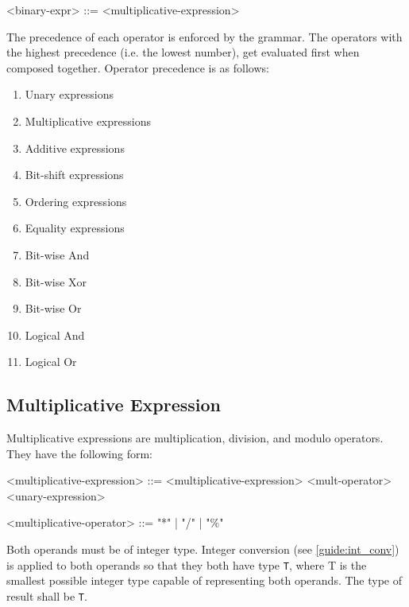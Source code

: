 \begin{minip}
\begin{grammar}
<binary-expr> ::= <multiplicative-expression>
\end{grammar}
\end{minip}

The precedence of each operator is enforced by the grammar. The operators with the highest precedence (i.e. the lowest number), get evaluated first when composed together. Operator precedence is as follows:

\begin{enumerate}
\singlespacing
\item Unary expressions
\item Multiplicative expressions
\item Additive expressions
\item Bit-shift expressions
\item Ordering expressions
\item Equality expressions
\item Bit-wise And
\item Bit-wise Xor
\item Bit-wise Or
\item Logical And
\item Logical Or
\end{enumerate}

\subsection{Multiplicative Expression} \label{guide:mult_expr}

Multiplicative expressions are multiplication, division, and modulo operators. They have the following form:

\begin{minip}
\begin{grammar}
<multiplicative-expression> ::= <multiplicative-expression> 
<mult-operator> <unary-expression>

<multiplicative-operator> ::= "*" | "/" | "\%"
\end{grammar}
\end{minip}

Both operands must be of integer type. Integer conversion (see \ref{guide:int_conv}) is applied to both operands so that they both have type \texttt{T}, where T is the smallest possible integer type capable of representing both operands. The type of result shall be \texttt{T}. 


